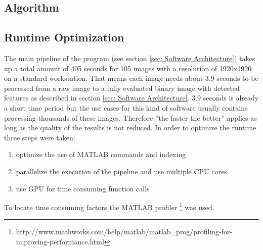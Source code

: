 \documentclass{article}
\begin{document}
\subsection{Algorithm}
\subsection{Runtime Optimization}
The main pipeline of the program (see section \ref{sec: Software Architecture}) takes up a total amount of 405 seconds for 105 images with a resolution of 1920x1920  on a standard workstation.
That means each image needs about 3.9 seconds to be processed from a raw image to a fully evaluated binary image with detected features as described in section \ref{sec: Software Architecture}.
3.9 seconds is already a short time period but the use cases for this kind of software usually contains processing thousands of these images.
Therefore ''the faster the better'' applies as long as the quality of the results is not reduced.
In order to optimize the runtime three steps were taken:

\begin{enumerate}
	\item optimize the use of MATLAB commands and indexing
	\item parallelize the execution of the pipeline and use multiple CPU cores
	\item use GPU for time consuming function calls
\end{enumerate}

To locate time consuming factors the MATLAB profiler \footnote{http://www.mathworks.com/help/matlab/matlab\_prog/profiling-for-improving-performance.html} was used.
\end{document}
